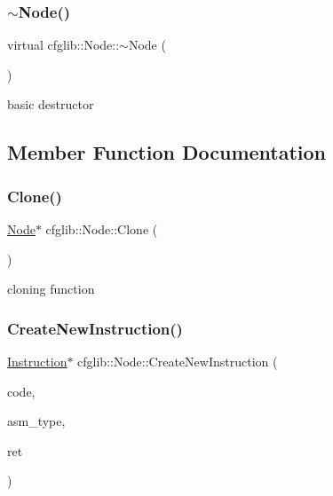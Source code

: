 \subsubsection{\texorpdfstring{$\sim$\+Node()}{~Node()}}
{\footnotesize\ttfamily virtual cfglib\+::\+Node\+::$\sim$\+Node (\begin{DoxyParamCaption}{ }\end{DoxyParamCaption})\hspace{0.3cm}{\ttfamily [virtual]}}

basic destructor 

\subsection{Member Function Documentation}
\mbox{\label{classcfglib_1_1Node_a5f9b90a1d189124c775e0af9c209d208}} 
\subsubsection{\texorpdfstring{Clone()}{Clone()}}
{\footnotesize\ttfamily \hyperlink{classcfglib_1_1Node}{Node}$\ast$ cfglib\+::\+Node\+::\+Clone (\begin{DoxyParamCaption}\item[{\hyperlink{classcfglib_1_1CloneHandle}{Clone\+Handle} \&}]{ }\end{DoxyParamCaption})}

cloning function \mbox{\label{classcfglib_1_1Node_ae0dc5993e16a3b637522c02819703833}} 
\subsubsection{\texorpdfstring{Create\+New\+Instruction()}{CreateNewInstruction()}}
{\footnotesize\ttfamily \hyperlink{classcfglib_1_1Instruction}{Instruction}$\ast$ cfglib\+::\+Node\+::\+Create\+New\+Instruction (\begin{DoxyParamCaption}\item[{std\+::string const \&}]{code,  }\item[{\hyperlink{namespacecfglib_a5ae32d51cf4ff1db5485367eab63a500}{asm\+\_\+type}}]{asm\+\_\+type,  }\item[{bool}]{ret }\end{DoxyParamCaption})}


